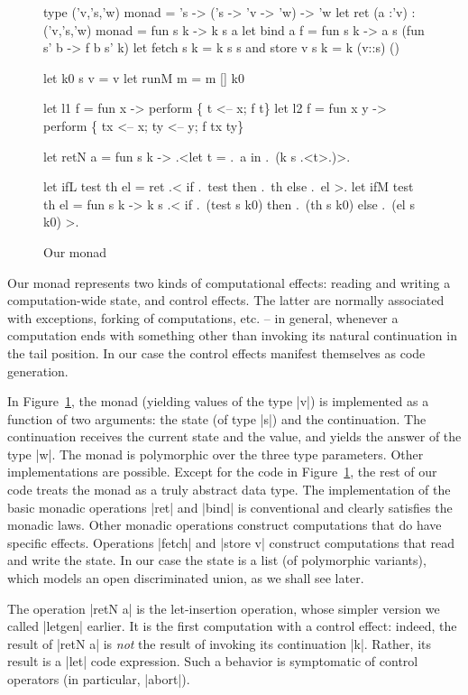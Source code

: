 \documentclass[draft]{elsart}
\begin{document}
\begin{figure}
\begin{code}
type ('v,'s,'w) monad = 's -> ('s -> 'v -> 'w) -> 'w
let ret (a :'v) : ('v,'s,'w) monad = fun s k -> k s a
let bind a f = fun s k -> a s (fun s' b -> f b s' k)
let fetch s k = k s s  and  store v s k = k (v::s) ()

let k0 s v = v
let runM m = m [] k0

let l1 f = fun x -> perform \{ t <-- x; f t\}
let l2 f = fun x y -> perform \{ tx <-- x; ty <-- y; f tx ty\}

let retN a = fun s k -> .<let t = .~a in .~(k s .<t>.)>.

let ifL test th el = ret .< if .~test then .~th else .~el >.
let ifM test th el = fun s k ->
  k s .< if .~(test s k0) then .~(th s k0) else .~(el s k0) >.
\end{code}
\caption{Our monad}\label{ourmonad}
\end{figure}

Our monad represents two kinds of computational effects: reading and
writing a computation-wide state, and control effects. The latter are
normally associated with exceptions, forking of computations, etc. --
in general, whenever a computation ends with something other than
invoking its natural continuation in the tail position. In our case
the control effects manifest themselves as code generation.

In Figure~\ref{ourmonad}, the monad (yielding values of the type |v|)
is implemented as a function of two
arguments: the state (of type |s|) and the continuation. The
continuation receives the current state and the value, and
yields the answer of the type |w|.  The monad is polymorphic over the
three type parameters.  Other implementations are
possible. Except for the code in Figure~\ref{ourmonad}, the rest of our code
treats the monad as a truly abstract data type. The implementation of
the basic
monadic operations |ret| and |bind| is conventional and clearly
satisfies the monadic laws. Other monadic operations
construct computations that do have specific effects.  Operations |fetch| and
|store v| construct computations that read and write the state. In our
case the state is a list (of polymorphic variants), which models an
open discriminated union, as we shall see later.

The operation |retN a| is the let-insertion operation, whose simpler
version we called |letgen| earlier. It is the first computation with
a control effect: indeed, the result of |retN a| is \emph{not} the
result of invoking its continuation |k|. Rather, its result is a |let|
code expression. Such a behavior is symptomatic of control operators
(in particular, |abort|).
\end{document}
